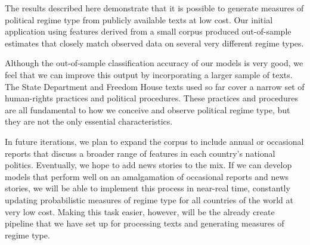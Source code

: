 \documentclass[pdftex,12pt,fullpage,oneside]{amsart}
\begin{document}
The results described here demonstrate that it is possible to generate measures of political regime type from publicly available texts at low cost. Our initial application using features derived from a small corpus produced out-of-sample estimates that closely match observed data on several very different regime types.

Although the out-of-sample classification accuracy of our models is very good, we feel that we can improve this output by incorporating a larger sample of texts. The State Department and Freedom House texts used so far cover a narrow set of human-rights practices and political procedures. These practices and procedures are all fundamental to how we conceive and observe political regime type, but they are not the only essential characteristics.

In future iterations, we plan to expand the corpus to include annual or occasional reports that discuss a broader range of features in each country's national politics. Eventually, we hope to add news stories to the mix. If we can develop models that perform well on an amalgamation of occasional reports and news stories, we will be able to implement this process in near-real time, constantly updating probabilistic measures of regime type for all countries of the world at very low cost. Making this task easier, however, will be the already create pipeline that we have set up for processing texts and generating measures of regime type. 

\newpage


\end{document}
